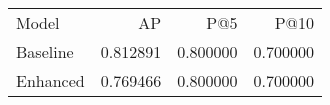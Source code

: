 \begin{tabular}{lrrr}
Model & AP & P@5 & P@10 \\
Baseline & 0.812891 & 0.800000 & 0.700000 \\
Enhanced & 0.769466 & 0.800000 & 0.700000 \\
\end{tabular}
